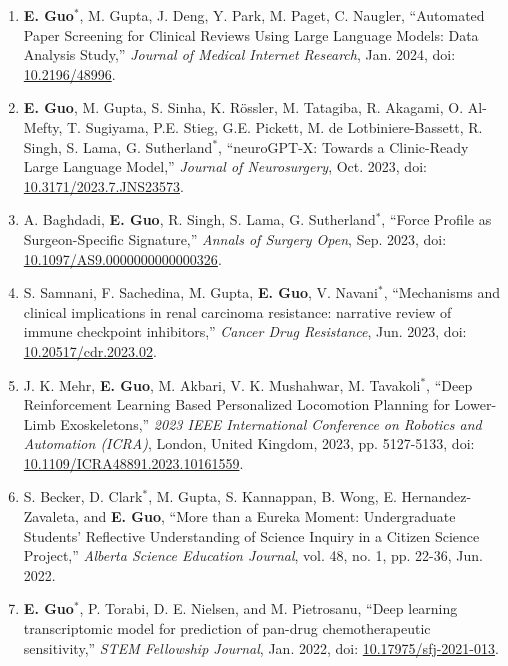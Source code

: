 \documentclass{article}
\begin{document}
\begin{enumerate}
    \item \textbf{E. Guo}$^*$, M. Gupta, J. Deng, Y. Park, M. Paget, C. Naugler, ``Automated Paper Screening for Clinical Reviews Using Large Language Models: Data Analysis Study,'' \textit{Journal of Medical Internet Research}, Jan. 2024, doi: \href{https://doi.org/10.2196/48996}{10.2196/48996}.
    \item \textbf{E. Guo}, M. Gupta, S. Sinha, K. R\"ossler, M. Tatagiba, R. Akagami, O. Al-Mefty, T. Sugiyama, P.E. Stieg, G.E. Pickett, M. de Lotbiniere-Bassett, R. Singh, S. Lama, G. Sutherland$^*$, ``neuroGPT-X: Towards a Clinic-Ready Large Language Model,'' \textit{Journal of Neurosurgery}, Oct. 2023, doi: \href{https://doi.org/10.3171/2023.7.JNS23573}{10.3171/2023.7.JNS23573}.
    \item A. Baghdadi, \textbf{E. Guo}, R. Singh, S. Lama, G. Sutherland$^*$, ``Force Profile as Surgeon-Specific Signature,'' \textit{Annals of Surgery Open}, Sep. 2023, doi: \href{https://doi.org/10.1097/AS9.0000000000000326}{10.1097/AS9.0000000000000326}.
    \item S. Samnani, F. Sachedina, M. Gupta, \textbf{E. Guo}, V. Navani$^*$, ``Mechanisms and clinical implications in renal carcinoma resistance: narrative review of immune checkpoint inhibitors,'' \textit{Cancer Drug Resistance}, Jun. 2023, doi: \href{https://doi.org/10.20517/cdr.2023.02 }{10.20517/cdr.2023.02}.
    \item J. K. Mehr, \textbf{E. Guo}, M. Akbari, V. K. Mushahwar, M. Tavakoli$^*$, ``Deep Reinforcement Learning Based Personalized Locomotion Planning for Lower-Limb Exoskeletons,'' \textit{2023 IEEE International Conference on Robotics and Automation (ICRA)}, London, United Kingdom, 2023, pp. 5127-5133, doi: \href{https://doi.org/10.1109/ICRA48891.2023.10161559}{10.1109/ICRA48891.2023.10161559}.
    \item S. Becker, D. Clark$^*$, M. Gupta, S. Kannappan, B. Wong, E. Hernandez-Zavaleta, and \textbf{E. Guo}, ``More than a Eureka Moment: Undergraduate Students' Reflective Understanding of Science Inquiry in a Citizen Science Project,'' \textit{Alberta Science Education Journal}, vol. 48, no. 1, pp. 22-36, Jun. 2022.
    \item \textbf{E. Guo$^*$}, P. Torabi, D. E. Nielsen, and M. Pietrosanu, ``Deep learning transcriptomic model for prediction of pan-drug chemotherapeutic sensitivity,'' \textit{STEM Fellowship Journal}, Jan. 2022, doi: \href{https://doi.org/10.17975/sfj-2021-013}{10.17975/sfj-2021-013}.
\end{enumerate} \vspace{1em}
\end{document}
